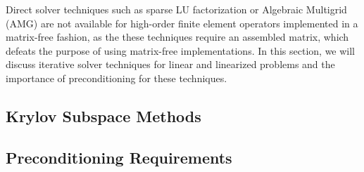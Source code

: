 Direct solver techniques such as sparse LU factorization or Algebraic Multigrid (AMG) are not available for high-order finite element operators implemented in a matrix-free fashion, as the these techniques require an assembled matrix, which defeats the purpose of using matrix-free implementations.
In this section, we will discuss iterative solver techniques for linear and linearized problems and the importance of preconditioning for these techniques.

\subsection{Krylov Subspace Methods}


\subsection{Preconditioning Requirements}

